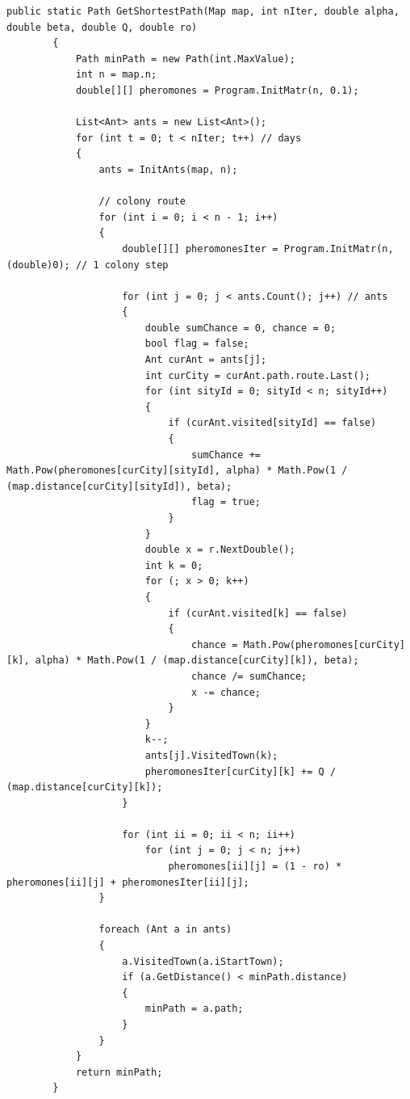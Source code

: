\documentclass[12pt]{report}
\begin{document}
\begin{lstlisting}[label=some-code,caption=Муравьиный алгоритм]
public static Path GetShortestPath(Map map, int nIter, double alpha, double beta, double Q, double ro)
        {
            Path minPath = new Path(int.MaxValue);
            int n = map.n;
            double[][] pheromones = Program.InitMatr(n, 0.1);

            List<Ant> ants = new List<Ant>();
            for (int t = 0; t < nIter; t++) // days
            {
                ants = InitAnts(map, n);

                // colony route
                for (int i = 0; i < n - 1; i++)
                {
                    double[][] pheromonesIter = Program.InitMatr(n, (double)0); // 1 colony step

                    for (int j = 0; j < ants.Count(); j++) // ants
                    {
                        double sumChance = 0, chance = 0;
                        bool flag = false;
                        Ant curAnt = ants[j];
                        int curCity = curAnt.path.route.Last();
                        for (int sityId = 0; sityId < n; sityId++) 
                        {
                            if (curAnt.visited[sityId] == false)
                            {
                                sumChance += Math.Pow(pheromones[curCity][sityId], alpha) * Math.Pow(1 / (map.distance[curCity][sityId]), beta);
                                flag = true;
                            }
                        }
                        double x = r.NextDouble();
                        int k = 0;
                        for (; x > 0; k++)
                        {
                            if (curAnt.visited[k] == false)
                            {
                                chance = Math.Pow(pheromones[curCity][k], alpha) * Math.Pow(1 / (map.distance[curCity][k]), beta);
                                chance /= sumChance;
                                x -= chance;
                            }
                        }
                        k--;
                        ants[j].VisitedTown(k);
                        pheromonesIter[curCity][k] += Q / (map.distance[curCity][k]);
                    }

                    for (int ii = 0; ii < n; ii++)
                        for (int j = 0; j < n; j++)
                            pheromones[ii][j] = (1 - ro) * pheromones[ii][j] + pheromonesIter[ii][j];
                }
                
                foreach (Ant a in ants)
                {
                    a.VisitedTown(a.iStartTown);
                    if (a.GetDistance() < minPath.distance)
                    {
                        minPath = a.path;
                    }
                }                
            }
            return minPath;
        }
\end{lstlisting}
\end{document}
